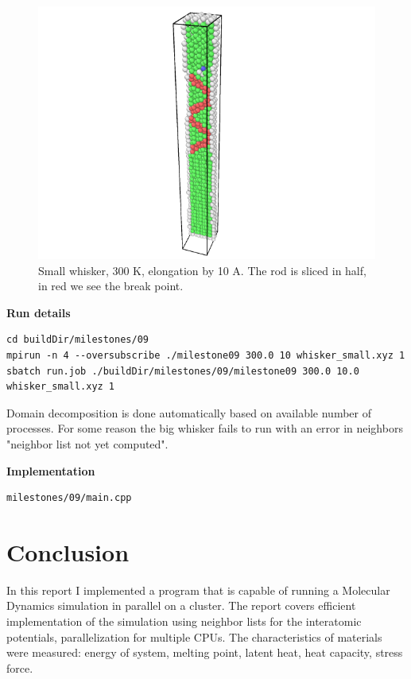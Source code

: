 \documentclass[12pt,a4paper]{article}
\begin{document}
\begin{figure}[h!]
	\centering
	\includegraphics[width=.85\linewidth]{img/milestone09-small-300-10-pic.png}
	\caption{Small whisker, 300 K, elongation by 10 A. The rod is sliced in half, in red we see the break point.}
	\label{fig:whisker-defect}
\end{figure}


{\bf Run details}
\begin{lstlisting}[breaklines]
cd buildDir/milestones/09
mpirun -n 4 --oversubscribe ./milestone09 300.0 10 whisker_small.xyz 1
sbatch run.job ./buildDir/milestones/09/milestone09 300.0 10.0 whisker_small.xyz 1
\end{lstlisting}

Domain decomposition is done automatically based on available number of processes.
For some reason the big whisker fails to run with an error in neighbors "neighbor list not yet computed".

{\bf Implementation}
\begin{lstlisting}[breaklines]
milestones/09/main.cpp
\end{lstlisting}

\clearpage
\section{Conclusion}
\label{conclusion}

In this report I implemented a program that is capable of running a Molecular Dynamics simulation in parallel on a cluster. The report covers efficient implementation of the simulation using neighbor lists for the interatomic potentials, parallelization for multiple CPUs. The characteristics of materials were measured: energy of system, melting point, latent heat, heat capacity, stress force.

\newpage
{\small
	
	
}
\end{document}
